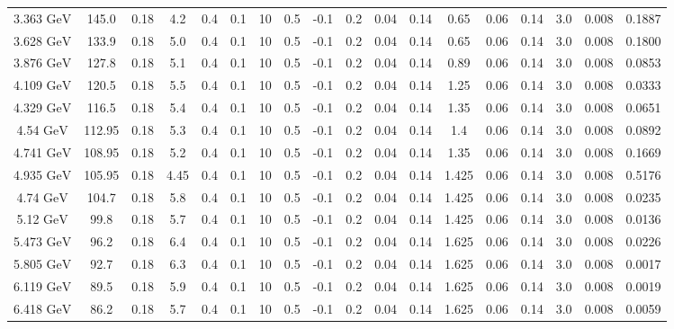 \documentclass[11pt]{article}
\begin{document}
\begin{table}[htbp]
{\begin{tabular}{cccccccccccccccccc}
				3.363 ${\textrm{GeV}}$ & 145.0 & 0.18 & 4.2 & 0.4 & 0.1 & 10 & 0.5 & -0.1 & 0.2 & 0.04 & 0.14 & 0.65 & 0.06 & 0.14 & 3.0 & 0.008 & 0.1887 \\
				3.628 ${\textrm{GeV}}$ & 133.9 & 0.18 & 5.0 & 0.4 & 0.1 & 10 & 0.5 & -0.1 & 0.2 & 0.04 & 0.14 & 0.65 & 0.06 & 0.14 & 3.0 & 0.008 & 0.1800 \\
				3.876 ${\textrm{GeV}}$ & 127.8 & 0.18 & 5.1 & 0.4 & 0.1 & 10 & 0.5 & -0.1 & 0.2 & 0.04 & 0.14 & 0.89 & 0.06 & 0.14 & 3.0 & 0.008 & 0.0853 \\
				4.109 ${\textrm{GeV}}$ & 120.5 & 0.18 & 5.5 & 0.4 & 0.1 & 10 & 0.5 & -0.1 & 0.2 & 0.04 & 0.14 & 1.25 & 0.06 & 0.14 & 3.0 & 0.008 & 0.0333 \\
				4.329 ${\textrm{GeV}}$ & 116.5 & 0.18 & 5.4 & 0.4 & 0.1 & 10 & 0.5 & -0.1 & 0.2 & 0.04 & 0.14 & 1.35 & 0.06 & 0.14 & 3.0 & 0.008 & 0.0651 \\
				4.54 ${\textrm{GeV}}$ & 112.95 & 0.18 & 5.3 & 0.4 & 0.1 & 10 & 0.5 & -0.1 &  0.2 & 0.04 & 0.14 & 1.4 & 0.06 & 0.14 & 3.0 & 0.008 & 0.0892 \\
				4.741 ${\textrm{GeV}}$ & 108.95 & 0.18 & 5.2 & 0.4 & 0.1 & 10 & 0.5 & -0.1 & 0.2 & 0.04 & 0.14 & 1.35 & 0.06 & 0.14 & 3.0 & 0.008 & 0.1669 \\
				4.935 ${\textrm{GeV}}$ & 105.95 & 0.18 & 4.45 & 0.4 & 0.1 & 10 & 0.5 & -0.1 & 0.2 & 0.04 & 0.14 & 1.425 & 0.06 & 0.14 & 3.0 & 0.008 & 0.5176 \\
				\midrule
				4.74 ${\textrm{GeV}}$ & 104.7 & 0.18 & 5.8 & 0.4 & 0.1 & 10 & 0.5 & -0.1 & 0.2 & 0.04 & 0.14 & 1.425 & 0.06 & 0.14 & 3.0 & 0.008 & 0.0235 \\
				5.12 ${\textrm{GeV}}$ & 99.8 & 0.18 & 5.7 & 0.4 & 0.1 & 10 & 0.5 & -0.1 & 0.2 & 0.04 & 0.14 & 1.425 & 0.06 & 0.14 & 3.0 & 0.008 & 0.0136 \\
				5.473 ${\textrm{GeV}}$ & 96.2 & 0.18 & 6.4 & 0.4 & 0.1 & 10 & 0.5 & -0.1 & 0.2 & 0.04 & 0.14 & 1.625 & 0.06 & 0.14 & 3.0 & 0.008 & 0.0226 \\
				5.805 ${\textrm{GeV}}$ & 92.7 & 0.18 & 6.3 & 0.4 & 0.1 & 10 & 0.5 & -0.1 & 0.2 & 0.04 & 0.14 & 1.625 & 0.06 & 0.14 & 3.0 & 0.008 & 0.0017 \\
				6.119 ${\textrm{GeV}}$ & 89.5 & 0.18 & 5.9 & 0.4 & 0.1 & 10 & 0.5 & -0.1 & 0.2 & 0.04 & 0.14 & 1.625 & 0.06 & 0.14 & 3.0 & 0.008 & 0.0019 \\
				6.418 ${\textrm{GeV}}$ & 86.2 & 0.18 & 5.7 & 0.4 & 0.1 & 10 & 0.5 & -0.1 & 0.2 & 0.04 & 0.14 & 1.625 & 0.06 & 0.14 & 3.0 & 0.008 & 0.0059 \\

\end{tabular}}
\end{table}
\end{document}
